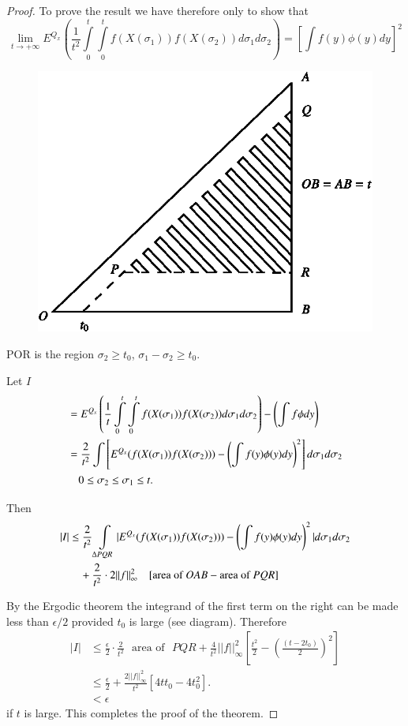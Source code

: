 \begin{proof}
To prove the result we have therefore only to show that
$$
\lim\limits_{t\to
  +\infty}E^{Q_{x}}\left(\frac{1}{t^{2}}\int\limits^{t}_{0}\int\limits^{t}_{0}f(X(\sigma_{1}))f(X(\sigma_{2}))d\sigma_{1}d\sigma_{2}\right)=\left[\int f(y)\phi(y)dy\right]^{2}
$$
\begin{figure}[H]
\centering
\includegraphics{figure/fig14.eps}
\end{figure}\pageoriginale

POR is the region $\sigma_{2}\geq t_{0}$, $\sigma_{1}-\sigma_{2}\geq
t_{0}$.

Let $I$
\begin{align*}
&
  =E^{Q_{x}}\left(\frac{1}{t}\int\limits^{t}_{0}\int\limits^{t}_{0}f(X(\sigma_{1}))f(X(\sigma_{2}))d\sigma_{1}d\sigma_{2}\right)-\left(\int
  f\phi dy\right)\\
&= \frac{2}{t^{2}}\int
  \left[E^{Q_{x}}(f(X(\sigma_{1}))f(X(\sigma_{2})))-\left(\int
    f(y)\phi(y)dy\right)^{2}\right]d\sigma_{1}d\sigma_{2}\\
&\quad 0\leq \sigma_{2}\leq \sigma_{1}\leq t.
\end{align*}

Then
\begin{align*}
|I| &\leq \frac{2}{t^{2}}\int\limits_{\Delta
  PQR}|E^{Q_{x}}(f(X(\sigma_{1}))f(X(\sigma_{2})))-\left(\int
  f(y)\phi(y)dy\right)^{2}|d\sigma_{1}d\sigma_{2}\\
&\quad +\frac{2}{t^{2}}\cdot 2||f||^{2}_{\infty}\quad [\text{area of~ } OAB-
    \text{area of~ } PQR]
\end{align*}

By the Ergodic theorem the integrand of the first term on the right
can be made less than $\epsilon/2$ provided $t_{0}$ is large (see
diagram). Therefore
\begin{align*}
|I| &\leq \frac{\epsilon}{2}\cdot \frac{2}{t^{2}}\text{~ area of~ }PQR
+\frac{4}{t^{2}}||f||^{2}_{\infty}\left[\frac{t^{2}}{2}-\left(\frac{(t-2t_{0})}{2}\right)^{2}\right]\\ 
&\leq
\frac{\epsilon}{2}+\frac{2||f||^{2}_{\infty}}{t^{2}}[4tt_{0}-4t_{0}^{2}].\\
&<\epsilon 
\end{align*}\pageoriginale
if $t$ is large. This completes the proof of the theorem.
\end{proof}
